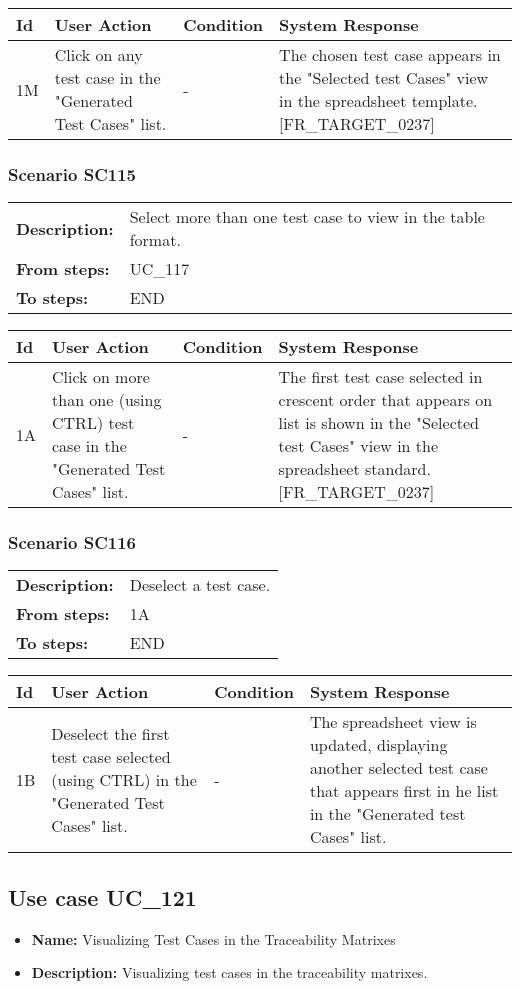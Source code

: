 \documentclass[a4paper,11pt]{article}
\newcommand{\bl}{\\ \hline}
\begin{document}
\begin{tabular}{|p{0.8in}|p{1.6in}|p{1.6in}|p{1.6in}|}
\hline
Id & User Action & Condition & System Response  \bl 
1M & Click on any test case in the "Generated Test Cases" list.
					 & - & The chosen test case appears in the "Selected test Cases"
						view in the spreadsheet template. [FR_TARGET_0237] \bl 
\end{tabular}
\subsubsection*{Scenario SC115}
\begin{tabular}{p{1in}p{4in}}
{\bf Description:} & Select more than one test case to view in the table
					format. \\
{\bf From steps:} & UC_117#2M \\
{\bf To steps:} & END \\
\end{tabular}
 
\begin{tabular}{|p{0.8in}|p{1.6in}|p{1.6in}|p{1.6in}|}
\hline
Id & User Action & Condition & System Response  \bl 
1A & Click on more than one (using CTRL) test case in the
						"Generated Test Cases" list. & - & The first test case selected in crescent order that
						appears on list is shown in the "Selected test Cases" view in the
						spreadsheet standard. [FR_TARGET_0237] \bl 
\end{tabular}
\subsubsection*{Scenario SC116}
\begin{tabular}{p{1in}p{4in}}
{\bf Description:} & Deselect a test case. \\
{\bf From steps:} & 1A \\
{\bf To steps:} & END \\
\end{tabular}
 
\begin{tabular}{|p{0.8in}|p{1.6in}|p{1.6in}|p{1.6in}|}
\hline
Id & User Action & Condition & System Response  \bl 
1B & Deselect the first test case selected (using CTRL) in the
						"Generated Test Cases" list. & - & The spreadsheet view is updated, displaying another
						selected test case that appears first in he list in the "Generated
						test Cases" list.  \bl 
\end{tabular}
\subsection*{Use case UC_121}
\begin{itemize}
\item {\bf Name: }Visualizing Test Cases in the Traceability Matrixes
\item {\bf Description: }Visualizing test cases in the traceability matrixes.
			
\end{itemize}
\end{document}
